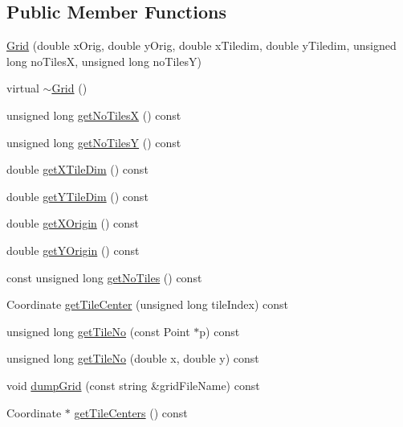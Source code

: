 \subsection*{Public Member Functions}
\begin{DoxyCompactItemize}
\item 
\hyperlink{class_grid_a84b0dc169028f21175a4549afde86153}{Grid} (double x\+Orig, double y\+Orig, double x\+Tiledim, double y\+Tiledim, unsigned long no\+TilesX, unsigned long no\+TilesY)
\item 
virtual \hyperlink{class_grid_a241c623291936ddbf4f670a796523a91}{$\sim$\+Grid} ()
\item 
unsigned long \hyperlink{class_grid_af29c0c404a908aa46f83afb17d7609a6}{get\+No\+TilesX} () const
\item 
unsigned long \hyperlink{class_grid_a783a3153d03154cfd33e6a418bb8d390}{get\+No\+TilesY} () const
\item 
double \hyperlink{class_grid_a1c5b9ad91fac264bcdd67f99bc93f663}{get\+X\+Tile\+Dim} () const
\item 
double \hyperlink{class_grid_aedfe477f5be79a375bd64a4d21765918}{get\+Y\+Tile\+Dim} () const
\item 
double \hyperlink{class_grid_a08b534c7f8e1099a6903bf08d9727842}{get\+X\+Origin} () const
\item 
double \hyperlink{class_grid_a53141770920cf261579cf164a8909af9}{get\+Y\+Origin} () const
\item 
const unsigned long \hyperlink{class_grid_ab0a71c762b6c33e6fa2fd49dde38228b}{get\+No\+Tiles} () const
\item 
Coordinate \hyperlink{class_grid_aa8d3de015a2b22d0cd0d72b3e7c29088}{get\+Tile\+Center} (unsigned long tile\+Index) const
\item 
unsigned long \hyperlink{class_grid_a93e42713b7af1f188ce90f92a5e202ab}{get\+Tile\+No} (const Point $\ast$p) const
\item 
unsigned long \hyperlink{class_grid_a02dee9ad3ee575623916c0041f72eb5e}{get\+Tile\+No} (double x, double y) const
\item 
void \hyperlink{class_grid_a0024d8d3cdd7b95f9fd61205ce8b9dea}{dump\+Grid} (const string \&grid\+File\+Name) const
\item 
Coordinate $\ast$ \hyperlink{class_grid_aa1b1f4c938207b16694a27cb9beb66eb}{get\+Tile\+Centers} () const
\end{DoxyCompactItemize}
